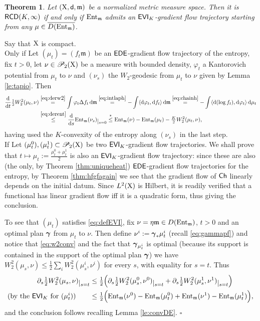 \documentclass[11pt]{article}
\numberwithin{equation}{section}
\newtheorem{theorem}{Theorem}[section]
\newenvironment{idea}{\removelastskip\par\medskip   %
\noindent{\em Idea of the proof} \rm}{\penalty-20\null\hfill$\square$\par\medbreak}
\newcommand{\ggamma}{{\mbox{\boldmath$\gamma$}}}
\newcommand{\restr}[1]{\lower3pt\hbox{$|_{#1}$}}
\newcommand{\prd}{\mathscr P_2}
\newcommand{\X}{{\rm X}}
\newcommand{\sfd}{{\sf d}}
\newcommand{\mm}{{\mathfrak m}}
\newcommand{\RCD}{{\sf RCD}}
\newcommand{\ch}{{\sf Ch}}
\newcommand{\ent}{{\rm Ent}_\mm}
\renewcommand{\d}{{\rm d}}
\newcommand\la{\langle}
\newcommand\ra{\rangle}
\newcommand{\EDE}{{\sf EDE}}
\newcommand{\EVI}{{\sf EVI}}
\begin{document}
\begin{theorem}\label{thm:rcdevi} Let $(\X,\sfd,\mm)$ be a normalized metric measure space. Then it is $\RCD(K,\infty)$ if and only if $\ent$ admits an $\EVI_K$-gradient flow trajectory starting from any $\mu\in \overline{D(\ent)}$.
\end{theorem}
\begin{idea} Say that $\X$ is compact.\\
{\sc Only if} Let $(\mu_t)=(f_t\mm)$ be an $\EDE$-gradient flow trajectory of the entropy, fix $t>0$, let $\nu\in\prd(\X)$ be a measure with bounded density, $\varphi_t$ a Kantorovich potential from $\mu_t$ to $\nu$ and $(\nu_s)$ the $W_2$-geodesic from $\mu_t$ to $\nu$ given by Lemma \ref{le:tapio}. Then 
\begin{equation}
\label{eq:bello}
\begin{split}
\frac\d{\d t}\tfrac12W_2^2(\mu_t,\nu)&\stackrel{\eqref{eq:derw2}}=\int\varphi_t\Delta f_t\,\d\mm\stackrel{\eqref{eq:intlaph}}=-\int\la\d \varphi_t,\d f_t\ra\,\d\mm\stackrel{\eqref{eq:chainh}}=-\int\la \d(\log f_t),\d\varphi_t\ra \,\d\mu_t\\
&\stackrel{\eqref{eq:derent}}\leq \frac\d{\d s}\ent(\nu_s)\restr{s=0} \stackrel{*}\leq \ent(\nu)-\ent(\mu_t)-\tfrac K2W_2^2(\mu_t,\nu),
\end{split}
\end{equation}
having used the $K$-convexity of the entropy along $(\nu_s)$ in the last step.\\
{\sc If} Let $(\mu^0_t),(\mu^1_t)\subset \prd(\X)$ be two $\EVI_K$-gradient flow trajectories. We shall prove that $t\mapsto\mu_t:=\frac{\mu^0_t+\mu^1_t}2$ is also an $\EVI_K$-gradient flow trajectory: since these are also (the only, by Theorem \ref{thm:uniqueheat}) $\EDE$-gradient flow trajectories for the entropy, by Theorem \ref{thm:hfgfagain} we see that the gradient flow of $\ch$ linearly depends on the initial datum. Since $L^2(\X)$ is Hilbert, it is readily verified that a functional has linear gradient flow iff it is a quadratic form, thus giving the conclusion. 

To see that $(\mu_t)$ satisfies \eqref{eq:defEVI}, fix $\nu=\eta\mm\in D(\ent)$, $t>0$ and an optimal plan $\ggamma$ from $\mu_t$ to $\nu$. Then define $\nu^i:=\ggamma_*\mu^i_t$ (recall \eqref{eq:gammapf}) and notice that \eqref{eq:w2conv} and the fact that $\ggamma_{\mu^i_t}$ is optimal (because its support is contained in the support of the optimal plan $\ggamma$) we have $W_2^2(\mu_s,\nu)\leq \tfrac12\sum_{i}W_2^2(\mu^i_s,\nu^i)$ for every $s$, with equality for $s=t$. Thus
\[
\begin{split}
\partial_s\tfrac12W_2^2(\mu_s,\nu)\restr{s=t}&\leq \tfrac12\Big(\partial_s\tfrac12W_2^2(\mu^0_s,\nu^0)\restr{s=t}+\partial_s\tfrac12W_2^2(\mu^1_s,\nu^1)\restr{s=t}\Big)\\
\text{(by the $\EVI_K$ for $(\mu^i_t)$)}\qquad &\leq \tfrac12\Big(\ent(\nu^0)-\ent(\mu^0_t)+\ent(\nu^1)-\ent(\mu^1_t)\Big),%
\end{split}
\]
and the conclusion follows recalling Lemma \ref{le:convDE}.
\end{idea}
\end{document}
